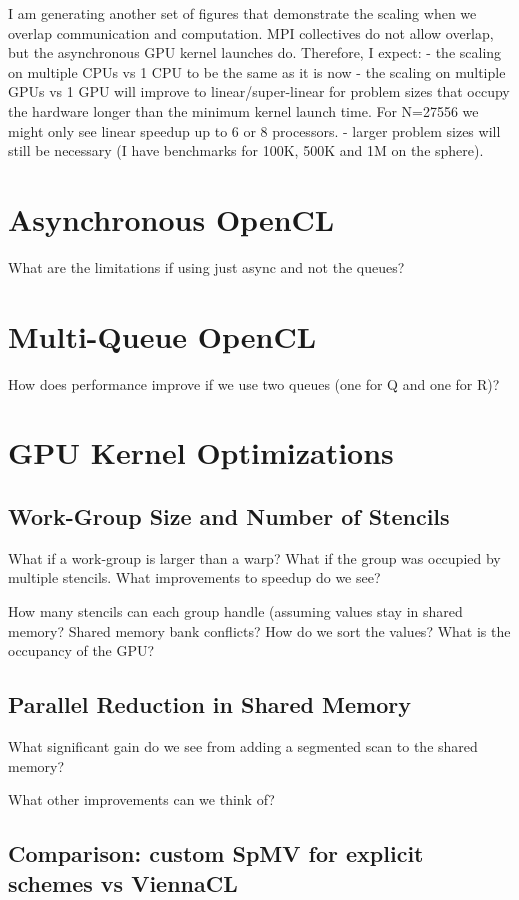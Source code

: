 I am generating another set of figures that demonstrate the scaling when we overlap communication and computation. MPI collectives do not allow overlap, but the asynchronous GPU kernel launches do. Therefore, I expect:
    - the scaling on multiple CPUs vs 1 CPU to be the same as it is now
    - the scaling on multiple GPUs vs 1 GPU will improve to linear/super-linear for problem sizes that occupy the hardware longer than the minimum kernel launch time. For N=27556 we might only see linear speedup up to 6 or 8 processors. 
    - larger problem sizes will still be necessary (I have benchmarks for 100K, 500K and 1M on the sphere).
    




\section{Asynchronous OpenCL}

What are the limitations if using just async and not the queues?

\section{Multi-Queue OpenCL}
How does performance improve if we use two queues (one for Q and one for R)? 

\section{GPU Kernel Optimizations}

\subsection{Work-Group Size and Number of Stencils}
What if a work-group is larger than a warp? What if the group was occupied by multiple stencils. What improvements to speedup do we see?

How many stencils can each group handle (assuming values stay in shared memory? 
Shared memory bank conflicts? How do we sort the values? 
What is the occupancy of the GPU?

\subsection{Parallel Reduction in Shared Memory}
What significant gain do we see from adding a segmented scan to the shared memory? 

What other improvements can we think of? 

\subsection{Comparison: custom SpMV for explicit schemes vs ViennaCL}